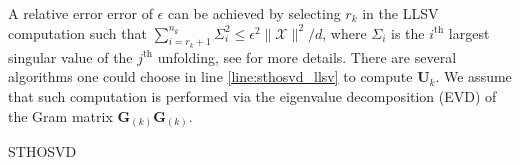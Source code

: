     A relative error error of $\epsilon$ can be achieved by selecting $r_k$ in
    the LLSV computation such that \(\sum_{i=r_k+1}^{n_k}\varSigma_i^2 \leq
    \epsilon^2 \|\mathcal{X}\|^2/d\), where $\varSigma_i$ is the $i^\text{th}$ largest
    singular value of the $j^\text{th}$ unfolding, see \cite{BK25} for more
    details. There are several algorithms one could choose in line
    \ref{line:sthosvd_llsv} to compute $\mathbf{U}_k$. We assume that such
    computation is performed via the eigenvalue decomposition (EVD) of the Gram
    matrix $\mathbf{G}_{(k)}\mathbf{G}_{(k)}$. 

    \begin{algorithm}
        \caption{STHOSVD}
        \label{alg:STHOSVD}
        \begin{algorithmic}
            
                    \label{line:sthosvd_llsv}  
                    \label{line:sthosvd_ttm} 
                \EndFor{}
                \vspace{10pt}
                 
                \vspace{10pt}
                 
            \EndFunction
        \end{algorithmic}
    \end{algorithm}

